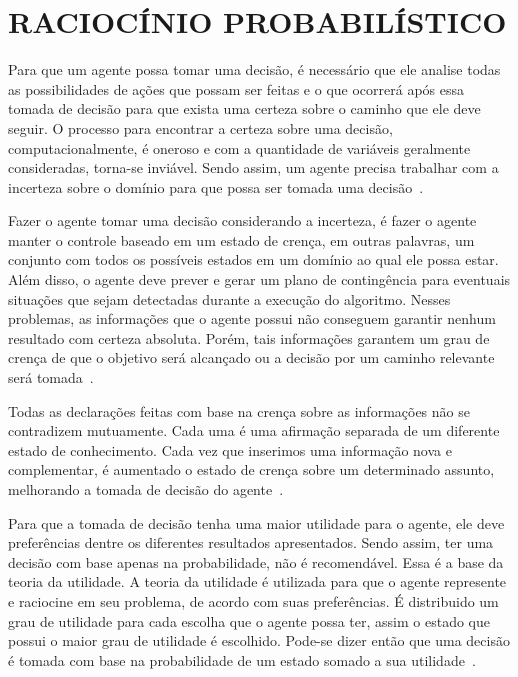 \chapter{RACIOCÍNIO PROBABILÍSTICO}
\label{cap:ai}

Para que um agente possa tomar uma decisão, é necessário que ele analise todas as possibilidades de ações que possam ser feitas e o que ocorrerá após essa tomada de decisão para que exista uma certeza sobre o caminho que ele deve seguir. O processo para encontrar a certeza sobre uma decisão, computacionalmente, é oneroso e com a quantidade de variáveis geralmente consideradas, torna-se inviável. Sendo assim, um agente precisa trabalhar com a incerteza sobre o domínio para que possa ser tomada uma decisão~\cite{Russell:2002}.

Fazer o agente tomar uma decisão considerando a incerteza, é fazer o agente manter o controle baseado em um estado de crença, em outras palavras, um conjunto com todos os possíveis estados em um domínio ao qual ele possa estar. Além disso, o agente deve prever e gerar um plano de contingência para eventuais situações que sejam detectadas durante a execução do algoritmo. Nesses problemas, as informações que o agente possui não conseguem garantir nenhum resultado com certeza absoluta. Porém, tais informações garantem um grau de crença de que o objetivo será alcançado ou a decisão por um caminho relevante será tomada~\cite{Russell:2002}.

Todas as declarações feitas com base na crença sobre as informações não se contradizem mutuamente. Cada uma é uma afirmação separada de um diferente estado de conhecimento. Cada vez que inserimos uma informação nova e complementar, é aumentado o estado de crença sobre um determinado assunto, melhorando a tomada de decisão do agente~\cite{Russell:2002}.

Para que a tomada de decisão tenha uma maior utilidade para o agente, ele deve preferências dentre os diferentes resultados apresentados. Sendo assim, ter uma decisão com base apenas na probabilidade, não é recomendável. Essa é a base da teoria da utilidade. A teoria da utilidade é utilizada para que o agente represente e raciocine em seu problema, de acordo com suas preferências. É distribuido um grau de utilidade para cada escolha que o agente possa ter, assim o estado que possui o maior grau de utilidade é escolhido. Pode-se dizer então que uma decisão é tomada com base na probabilidade de um estado somado a sua utilidade~\cite{Russell:2002}.

